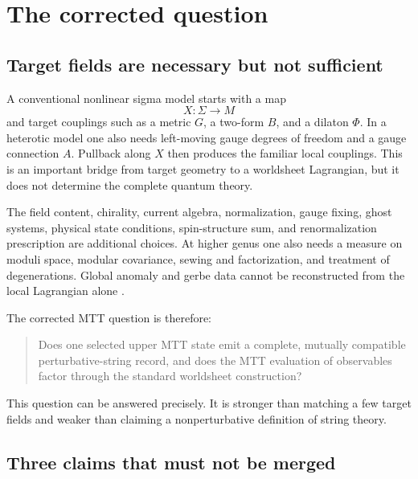 \documentclass[11pt]{article}
\theoremstyle{definition}
\theoremstyle{remark}
\begin{document}
\tableofcontents

\section{The corrected question}
\label{sec:intro}

\subsection{Target fields are necessary but not sufficient}

A conventional nonlinear sigma model starts with a map
\[
X:\Sigma\longrightarrow M
\]
and target couplings such as a metric \(G\), a two-form \(B\), and a dilaton
\(\Phi\).  In a heterotic model one also needs left-moving gauge degrees of
freedom and a gauge connection \(A\).  Pullback along \(X\) then produces the
familiar local couplings.  This is an important bridge from target geometry
to a worldsheet Lagrangian, but it does not determine the complete quantum
theory.

The field content, chirality, current algebra, normalization, gauge fixing,
ghost systems, physical state conditions, spin-structure sum, and
renormalization prescription are additional choices.  At higher genus one
also needs a measure on moduli space, modular covariance, sewing and
factorization, and treatment of degenerations.  Global anomaly and gerbe data
cannot be reconstructed from the local Lagrangian alone
\cite{Polchinski1998,GSW1987,Witten2012}.

The corrected MTT question is therefore:
\begin{quote}
Does one selected upper MTT state emit a complete, mutually compatible
perturbative-string record, and does the MTT evaluation of observables factor
through the standard worldsheet construction?
\end{quote}
This question can be answered precisely.  It is stronger than matching a few
target fields and weaker than claiming a nonperturbative definition of string
theory.

\subsection{Three claims that must not be merged}
\end{document}
